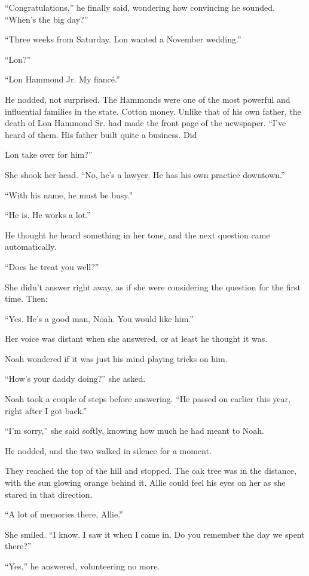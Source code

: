 \documentclass[10pt, twoside, openright]{book}
\begin{document}
``Congratulations,'' he finally said, wondering how convincing he
sounded. ``When's the big day?''


``Three weeks from Saturday. Lon wanted a November wedding.''

``Lon?''

``Lon Hammond Jr. My fiancé.''


He nodded, not surprised. The Hammonds were one of the most powerful and
influential families in the state. Cotton money. Unlike that of his own
father, the death of Lon Hammond Sr. had made the front page of the
newspaper. ``I've heard of them. His father built quite a business. Did

Lon take over for him?''

She shook her head. ``No, he's a lawyer. He has his own practice
downtown.''


``With his name, he must be busy.''

``He is. He works a lot.''


He thought he heard something in her tone, and the next question came
automatically.


``Does he treat you well?''


She didn't answer right away, as if she were considering the question
for the first time. Then:


``Yes. He's a good man, Noah. You would like him.''

Her voice was distant when she answered, or at least he thought it was.


Noah wondered if it was just his mind playing tricks on him.


``How's your daddy doing?'' she asked.


Noah took a couple of steps before answering. ``He passed on earlier
this year, right after I got back.''


``I'm sorry,'' she said softly, knowing how much he had meant to Noah.

He nodded, and the two walked in silence for a moment.


They reached the top of the hill and stopped. The oak tree was in the
distance, with the sun glowing orange behind it. Allie could feel his
eyes on her as she stared in that direction.


``A lot of memories there, Allie.''


She smiled. ``I know. I saw it when I came in. Do you remember the day
we spent there?''


``Yes,'' he answered, volunteering no more.
\end{document}
